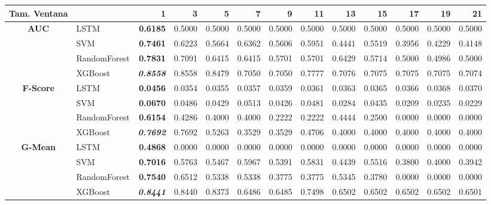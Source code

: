 \begin{table}[H]
	\centering
	\begin{adjustbox}{max width=12cm}
		\begin{tabular}{|c|l|r|r|r|r|r|r|r|r|r|r|r|}
			\hline
			\textbf{Tam. Ventana} &         &      1  &      3  &      5  &      7  &      9  &      11 &      13 &      15 &      17 &      19 &      21 \\
			\hline
			\textbf{AUC} &  LSTM & \textbf{  0.6185 } &  0.5000 &  0.5000 &  0.5000 &  0.5000 &  0.5000 &  0.5000 &  0.5000 &  0.5000 &  0.5000 &  0.5000 \\
			&  SVM & \textbf{  0.7461 } &  0.6223 &  0.5664 &  0.6362 &  0.5606 &  0.5951 &  0.4441 &  0.5519 &  0.3956 &  0.4229 &  0.4148 \\
			&  RandomForest & \textbf{  0.7831 } &  0.7091 &  0.6415 &  0.6415 &  0.5701 &  0.5701 &  0.6429 &  0.5714 &  0.5000 &  0.4986 &  0.5000 \\
			&  XGBoost & \textit{ \textbf{  0.8558 } } &  0.8558 &  0.8479 &  0.7050 &  0.7050 &  0.7777 &  0.7076 &  0.7075 &  0.7075 &  0.7075 &  0.7074 \\
			\hline
			\textbf{F-Score} &  LSTM & \textbf{  0.0456 } &  0.0354 &  0.0355 &  0.0357 &  0.0359 &  0.0361 &  0.0363 &  0.0365 &  0.0366 &  0.0368 &  0.0370 \\
			&  SVM & \textbf{  0.0670 } &  0.0486 &  0.0429 &  0.0513 &  0.0426 &  0.0481 &  0.0284 &  0.0435 &  0.0209 &  0.0235 &  0.0229 \\
			&  RandomForest & \textbf{  0.6154 } &  0.4286 &  0.4000 &  0.4000 &  0.2222 &  0.2222 &  0.4444 &  0.2500 &  0.0000 &  0.0000 &  0.0000 \\
			&  XGBoost & \textit{ \textbf{  0.7692 } } &  0.7692 &  0.5263 &  0.3529 &  0.3529 &  0.4706 &  0.4000 &  0.4000 &  0.4000 &  0.4000 &  0.4000 \\
			\hline
			\textbf{G-Mean} &  LSTM & \textbf{  0.4868 } &  0.0000 &  0.0000 &  0.0000 &  0.0000 &  0.0000 &  0.0000 &  0.0000 &  0.0000 &  0.0000 &  0.0000 \\
			&  SVM & \textbf{  0.7016 } &  0.5763 &  0.5467 &  0.5967 &  0.5391 &  0.5831 &  0.4439 &  0.5516 &  0.3800 &  0.4000 &  0.3942 \\
			&  RandomForest & \textbf{  0.7540 } &  0.6512 &  0.5338 &  0.5338 &  0.3775 &  0.3775 &  0.5345 &  0.3780 &  0.0000 &  0.0000 &  0.0000 \\
			&  XGBoost & \textit{ \textbf{  0.8441 } } &  0.8440 &  0.8373 &  0.6486 &  0.6485 &  0.7498 &  0.6502 &  0.6502 &  0.6502 &  0.6502 &  0.6501 \\

\end{tabular}
\end{adjustbox}
\end{table}
